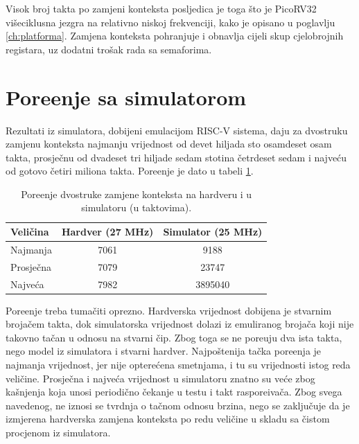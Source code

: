 Visok broj takta po zamjeni konteksta posljedica je toga \v{s}to je PicoRV32
vi\v{s}eciklusna jezgra na relativno niskoj frekvenciji, kako je opisano u
poglavlju \ref{ch:platforma}. Zamjena konteksta pohranjuje i obnavlja cijeli
skup cjelobrojnih registara, uz dodatni tro\v{s}ak rada sa semaforima.

\section{Pore\dj{}enje sa simulatorom}
\label{sec:mjerenje-poredjenje}

Rezultati iz simulatora, dobijeni emulacijom RISC-V sistema, daju za dvostruku
zamjenu konteksta najmanju vrijednost od devet hiljada sto osamdeset osam takta,
prosje\v{c}nu od dvadeset tri hiljade sedam stotina \v{c}etrdeset sedam i
najve\'cu od gotovo \v{c}etiri miliona takta. Pore\dj{}enje je dato u tabeli
\ref{table:poredjenje}.

\begin{table}[H]
\caption{Pore\dj{}enje dvostruke zamjene konteksta na hardveru i u simulatoru (u taktovima).}
\label{table:poredjenje}
\begin{center}
\begin{tabular}{lcc}
\hline
Veli\v{c}ina & Hardver (27 MHz) & Simulator (25 MHz) \\ \hline
Najmanja & 7061 & 9188 \\
Prosje\v{c}na & 7079 & 23747 \\
Najve\'ca & 7982 & 3895040 \\ \hline
\end{tabular}
\end{center}
\end{table}

Pore\dj{}enje treba tuma\v{c}iti oprezno. Hardverska vrijednost dobijena je
stvarnim broja\v{c}em takta, dok simulatorska vrijednost dolazi iz emuliranog
broja\v{c}a koji nije takovno ta\v{c}an u odnosu na stvarni \v{c}ip. Zbog toga se
ne pore\dj{}uju dva ista takta, nego model iz simulatora i stvarni hardver.
Najpo\v{s}tenija ta\v{c}ka pore\dj{}enja je najmanja vrijednost, jer nije optere\'cena
smetnjama, i tu su vrijednosti istog reda veli\v{c}ine. Prosje\v{c}na i najve\'ca
vrijednost u simulatoru znatno su ve\'ce zbog ka\v{s}njenja koja unosi
periodi\v{c}no \v{c}ekanje u testu i takt raspore\dj{}iva\v{c}a. Zbog svega
navedenog, ne iznosi se tvrdnja o ta\v{c}nom odnosu brzina, nego se zaklju\v{c}uje
da je izmjerena hardverska zamjena konteksta po redu veli\v{c}ine u skladu sa
\v{c}istom procjenom iz simulatora.

